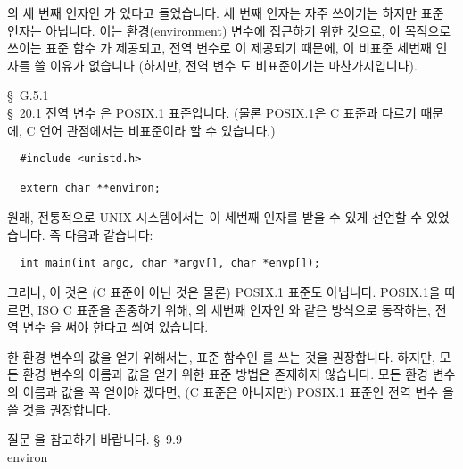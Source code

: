 \begin{faq}
	의 세 번째 인자인 가 있다고 들었습니다.
\A
	세 번째 인자는 자주 쓰이기는 하지만 표준 인자는 아닙니다.
	이는 환경(environment) 변수에 접근하기 위한 것으로,
	이 목적으로 쓰이는 표준 함수 가 제공되고,
	전역 변수로 이 제공되기 때문에,
	이 비표준 세번째 인자를 쓸 이유가 없습니다 (하지만,
	전역 변수 도 비표준이기는 마찬가지입니다).

\R
	\cite{c89} \S\ G.5.1 \\
	\cite{hs} \S\ 20.1 
\T
	전역 변수 은 POSIX.1 표준입니다. (물론 POSIX.1은
        C 표준과 다르기 때문에, C 언어 관점에서는 비표준이라 할 수 있습니다.)
\begin{verbatim}
  #include <unistd.h>

  extern char **environ;
\end{verbatim}
	원래, 전통적으로 UNIX 시스템에서는 이 세번째 인자를
        받을 수 있게 선언할 수 있었습니다. 즉 다음과 같습니다:
\begin{verbatim}
  int main(int argc, char *argv[], char *envp[]);
\end{verbatim}
	그러나, 이 것은 (C 표준이 아닌 것은 물론) POSIX.1 표준도
        아닙니다. POSIX.1을 따르면, ISO C 표준을 존중하기 위해, 의
        세번째 인자인 와 같은 방식으로 동작하는, 전역 변수
        을 써야 한다고 씌여 있습니다.

        한 환경 변수의 값을 얻기 위해서는, 표준 함수인 를 
        쓰는 것을 권장합니다. 하지만, 모든 환경 변수의 이름과 값을 얻기 위한
        표준 방법은 존재하지 않습니다. 모든 환경 변수의 이름과 값을 꼭 얻어야
        겠다면, (C 표준은 아니지만) POSIX.1 표준인 전역 변수 을
        쓸 것을 권장합니다.

        질문 을 참고하기 바랍니다.
\R
	\cite{hs5} \S\ 9.9  \\
        \cite{sus} environ
\end{faq}

